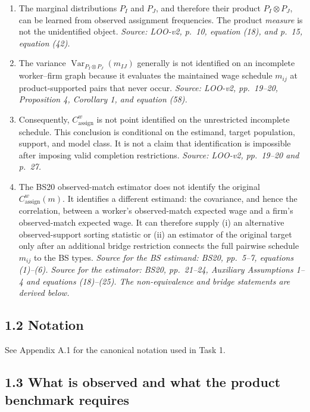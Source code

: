 \documentclass[11pt]{article}
\begin{document}
\begin{enumerate}
\item The marginal distributions \(P_I\) and \(P_J\), and therefore their
  product \(P_I\otimes P_J\), can be learned from observed assignment
  frequencies.  The product \emph{measure} is not the unidentified object.
  \textit{Source: LOO-v2, p.\ 10, equation (18), and p.\ 15, equation (42).}
\item The variance
  \(\operatorname{Var}_{P_I\otimes P_J}(m_{IJ})\) generally is not identified
  on an incomplete worker--firm graph because it evaluates the maintained wage
  schedule \(m_{ij}\) at product-supported pairs that never occur.
  \textit{Source: LOO-v2, pp.\ 19--20, Proposition 4, Corollary 1, and
  equation (58).}
\item Consequently, \(C^w_{\mathrm{assign}}\) is not point identified on the
  unrestricted incomplete schedule.  This conclusion is conditional on the
  estimand, target population, support, and model class.  It is not a claim
  that identification is impossible after imposing valid completion
  restrictions.  \textit{Source: LOO-v2, pp.\ 19--20 and p.\ 27.}
\item The BS20 observed-match estimator does not identify the original
  \(C^w_{\mathrm{assign}}(m)\).  It identifies a different estimand: the
  covariance, and hence the correlation, between a worker's observed-match
  expected wage and a firm's observed-match expected wage.  It can therefore
  supply (i) an alternative observed-support sorting statistic or (ii) an
  estimator of the original target only after an additional bridge restriction
  connects the full pairwise schedule \(m_{ij}\) to the BS types.
  \textit{Source for the BS estimand: BS20, pp.\ 5--7, equations (1)--(6).
  Source for the estimator: BS20, pp.\ 21--24, Auxiliary Assumptions 1--4 and
  equations (18)--(25).  The non-equivalence and bridge statements are derived
  below.}
\end{enumerate}

\subsection{1.2 Notation}

See Appendix A.1 for the canonical notation used in Task 1.

\subsection{1.3 What is observed and what the product benchmark requires}
\end{document}
